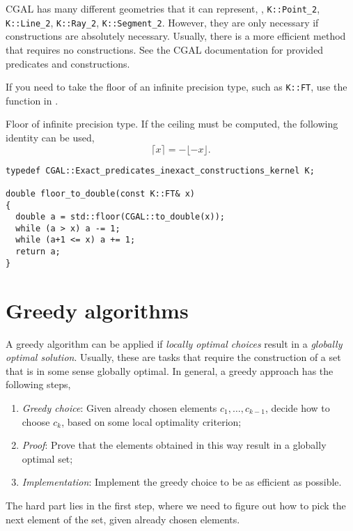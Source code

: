 \documentclass[justified,nobib]{tufte-handout}
\begin{document}
CGAL has many different geometries that it can represent, \eg,
\texttt{K::Point\_2}, \texttt{K::Line\_2}, \texttt{K::Ray\_2},
\texttt{K::Segment\_2}. However, they are only necessary if constructions are
absolutely necessary. Usually, there is a more
efficient method that requires no constructions. See the CGAL documentation for
provided predicates and constructions.

If you need to take the floor of an infinite precision type, such as
\texttt{K::FT}, use the function in .

\begin{listing}
  \caption{Floor of infinite precision type. If the ceiling must be computed,
  the following identity can be used, \[ \lceil x \rceil = -\lfloor -x \rfloor .\]}
  \label{lst:floor}
  \begin{lstlisting}
typedef CGAL::Exact_predicates_inexact_constructions_kernel K;

double floor_to_double(const K::FT& x)
{
  double a = std::floor(CGAL::to_double(x));
  while (a > x) a -= 1;
  while (a+1 <= x) a += 1;
  return a;
}
  \end{lstlisting}
\end{listing}

\section{Greedy algorithms}


A greedy algorithm can be applied if \textit{locally optimal choices} result in
a \textit{globally optimal solution}. Usually, these are tasks that require the
construction of a set that is in some sense globally optimal. In general, a
greedy approach has the following steps,
\begin{enumerate}
  \item \textit{Greedy choice}: Given already chosen elements $c_1,\ldots,
    c_{k-1}$, decide how to choose $c_k$, based on some local optimality
    criterion;
  \item \textit{Proof}: Prove that the elements obtained in this way result in
    a globally optimal set;
  \item \textit{Implementation}: Implement the greedy choice to be as efficient
    as possible.
\end{enumerate}
The hard part lies in the first step, where we need to figure out how to pick
the next element of the set, given already chosen elements.
\end{document}
